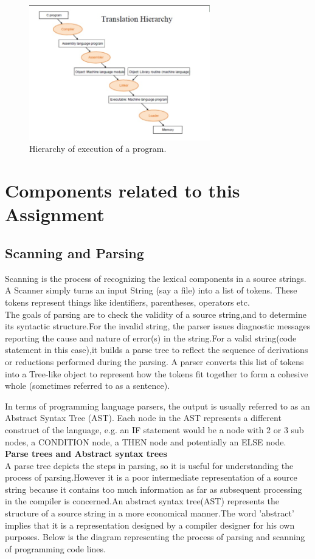 \documentclass[12pt]{article}
\begin{document}
\begin{figure}[!htb]
\centering
\includegraphics[width=0.7\textwidth]{hierarchy_assemble.jpg}
\caption{\label{fig:hierarchy}Hierarchy of execution of a program.}
\end{figure}

\section{Components related to this Assignment}

\subsection{Scanning and Parsing}
Scanning is the process of recognizing the lexical components in a source strings.
A Scanner simply turns an input String (say a file) into a list of tokens. These tokens represent things like identifiers, parentheses, operators etc.\\
The goals of parsing are to check the validity of a source string,and to determine its syntactic structure.For the invalid string, the parser issues diagnostic messages reporting the cause and nature of error(s) in the string.For a valid string(code statement in this case),it builds a parse tree to reflect the sequence of derivations or reductions performed during the parsing.
A parser converts this list of tokens into a Tree-like object to represent how the tokens fit together to form a cohesive whole (sometimes referred to as a sentence).


In terms of programming language parsers, the output is usually referred to as an Abstract Syntax Tree (AST). Each node in the AST represents a different construct of the language, e.g. an IF statement would be a node with 2 or 3 sub nodes, a CONDITION node, a THEN node and potentially an ELSE node.\\
\textbf{Parse trees and Abstract syntax trees}\\
A parse tree depicts the steps in parsing, so it is useful for understanding the process of parsing.However it is a poor intermediate representation of a source string because it contains too much information as far as subsequent processing in the compiler is concerned.An abstract syntax tree(AST)  represents the structure of a source string in a more economical manner.The word 'abstract'  implies that it is a representation designed by a compiler designer for his own purposes.
Below is the diagram representing the process of parsing and scanning of programming code lines.
\end{document}
